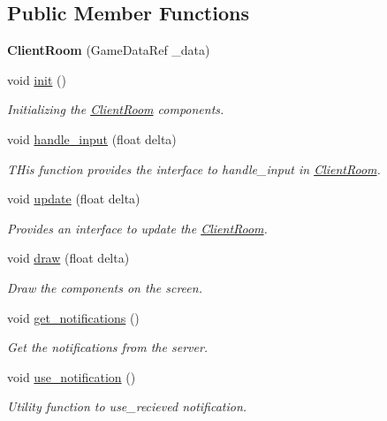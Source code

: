 \subsection*{Public Member Functions}
\begin{DoxyCompactItemize}
\item 
\mbox{\label{classcp_1_1_client_room_a8e636ababbdc41c50f486d37af2b64d5}} 
{\bfseries Client\+Room} (Game\+Data\+Ref \+\_\+data)
\item 
\mbox{\label{classcp_1_1_client_room_a9fa2892e03ca5eb0cce9221e83320058}} 
void \hyperlink{classcp_1_1_client_room_a9fa2892e03ca5eb0cce9221e83320058}{init} ()
\begin{DoxyCompactList}\small\item\em Initializing the \hyperlink{classcp_1_1_client_room}{Client\+Room} components. \end{DoxyCompactList}\item 
void \hyperlink{classcp_1_1_client_room_a8e0de6eeab8147b7d918b11c2eeccecf}{handle\+\_\+input} (float delta)
\begin{DoxyCompactList}\small\item\em T\+His function provides the interface to handle\+\_\+input in \hyperlink{classcp_1_1_client_room}{Client\+Room}. \end{DoxyCompactList}\item 
void \hyperlink{classcp_1_1_client_room_a09987dd7d61af43329b63a8ba9e3df69}{update} (float delta)
\begin{DoxyCompactList}\small\item\em Provides an interface to update the \hyperlink{classcp_1_1_client_room}{Client\+Room}. \end{DoxyCompactList}\item 
void \hyperlink{classcp_1_1_client_room_a9c8ff4227d9fa5e35511c756ddaafc83}{draw} (float delta)
\begin{DoxyCompactList}\small\item\em Draw the components on the screen. \end{DoxyCompactList}\item 
\mbox{\label{classcp_1_1_client_room_a073602b25e64da5644a0deb3ecbe1146}} 
void \hyperlink{classcp_1_1_client_room_a073602b25e64da5644a0deb3ecbe1146}{get\+\_\+notifications} ()
\begin{DoxyCompactList}\small\item\em Get the notifications from the server. \end{DoxyCompactList}\item 
\mbox{\label{classcp_1_1_client_room_abea3f2a34f619f4b2637b1486a809081}} 
void \hyperlink{classcp_1_1_client_room_abea3f2a34f619f4b2637b1486a809081}{use\+\_\+notification} ()
\begin{DoxyCompactList}\small\item\em Utility function to use\+\_\+recieved notification. \end{DoxyCompactList}\end{DoxyCompactItemize}
